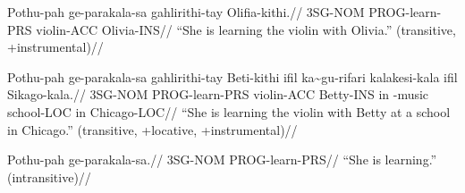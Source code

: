 \ex
\begingl
    \gla Pothu-pah ge-parakala-sa gahlirithi-tay Olifia-kithi.//
    \glb 3SG-NOM   PROG-learn-PRS violin-ACC Olivia-INS//
    \glft ``She is learning the violin with Olivia.'' (transitive, +instrumental)//
\endgl
\xe

\ex
\begingl
    \gla Pothu-pah ge-parakala-sa gahlirithi-tay Beti-kithi ifil ka\~{}gu-rifari kalakesi-kala ifil Sikago-kala.//
    \glb 3SG-NOM   PROG-learn-PRS violin-ACC Betty-INS in \agradj{}-music school-LOC in Chicago-LOC//
    \glft ``She is learning the violin with Betty at a school in Chicago.'' (transitive, +locative, +instrumental)//
\endgl
\xe

\ex
\begingl
    \gla Pothu-pah ge-parakala-sa.//
    \glb 3SG-NOM   PROG-learn-PRS//
    \glft ``She is learning.'' (intransitive)//
\endgl
\xe
